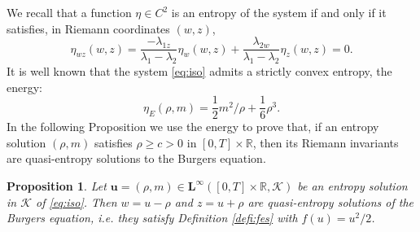 \documentclass[11pt, twoside, reqno]{amsart}
\newtheorem{prop}[thm]{Proposition}
\theoremstyle{definition}
\theoremstyle{remark}
\numberwithin{equation}{section}
\newcommand{\mc}[1]{\mathcal{#1}}
\newcommand{\bs}[1]{\boldsymbol{#1}}
\begin{document}
We recall that a function $\eta\in C^2$ is an entropy of the system if and only if it satisfies, in Riemann coordinates $(w,z)$,
\begin{equation}\label{eq:entropyiso}
    \eta_{wz}(w,z) = \frac{-\lambda_{1z}}{\lambda_1-\lambda_2} \eta_w(w,z) +  \frac{\lambda_{2w}}{\lambda_1-\lambda_2} \eta_z(w,z) = 0. 
\end{equation}
It is well known that the system \eqref{eq:iso} admits a strictly convex entropy, the energy:
$$
\eta_E(\rho, m) = \frac{1}{2} m^2/\rho + \frac{1}{6}\rho^3.
$$
In the following Proposition we use the energy to prove that, if an entropy solution $(\rho, m)$ satisfies $\rho \geq c >0$ in $[0,T] \times \mathbb R$, then its Riemann invariants are quasi-entropy solutions to the Burgers equation.
\begin{prop}\label{prop:wzfes}
    Let $\bs u = (\rho, m) \in \mathbf L^\infty([0,T] \times \mathbb R, \mc K)$ be an entropy solution in $\mc K$ of \eqref{eq:iso}. Then $w = u-\rho$ and $z = u+ \rho$ are quasi-entropy solutions of the Burgers equation, i.e. they satisfy Definition \ref{defi:fes} with $f (u)= u^2/2$.
\end{prop}
\end{document}
